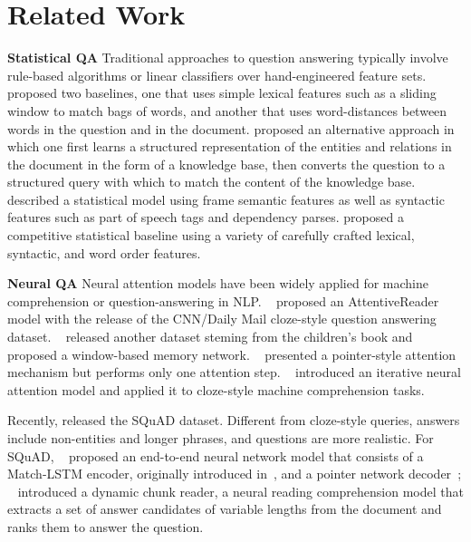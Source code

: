\documentclass{article} \usepackage{iclr2017_conference,times}
\begin{document}
\section{Related Work}

\textbf{Statistical QA}
Traditional approaches to question answering typically involve rule-based algorithms or linear classifiers over hand-engineered feature sets.
\citet{richardson2013mctest} proposed two baselines, one that uses simple lexical features such as a sliding window to match bags of words, and another that uses word-distances between words in the question and in the document.
\citet{berant2014modeling} proposed an alternative approach in which one first learns a structured representation of the entities and relations in the document in the form of a knowledge base, then converts the question to a structured query with which to match the content of the knowledge base.
\citet{wang2015frame} described a statistical model using frame semantic features as well as syntactic features such as part of speech tags and dependency parses.
\citet{chen2016thorough} proposed a competitive statistical baseline using a variety of carefully crafted lexical, syntactic, and word order features.

\textbf{Neural QA}
Neural attention models have been widely applied for machine comprehension or question-answering in NLP. ~\citet{hermann2015teaching} proposed an AttentiveReader model with the release of the CNN/Daily Mail cloze-style question answering dataset. ~\citet{hill2015goldilocks} released another dataset steming from the children's book and proposed a window-based memory network. ~\citet{kadlec2016text} presented a pointer-style attention mechanism but performs only one attention step. ~\citet{sordoni2016iterative} introduced an iterative neural attention model and applied it to cloze-style machine comprehension tasks.

Recently, \citet{rajpurkar2016squad} released the SQuAD dataset. Different from cloze-style queries, answers include non-entities and longer phrases, and questions are more realistic. For SQuAD, ~\citet{wang2016machine} proposed an end-to-end neural network model that consists of a Match-LSTM encoder, originally introduced in~\citet{wang2015learning}, and a pointer network decoder~\citep{vinyals2015pointer}; ~\citet{yuyang2015} introduced a dynamic chunk reader, a neural reading comprehension model that extracts a set of answer candidates of variable lengths from the document and ranks them to answer the question.
\end{document}
